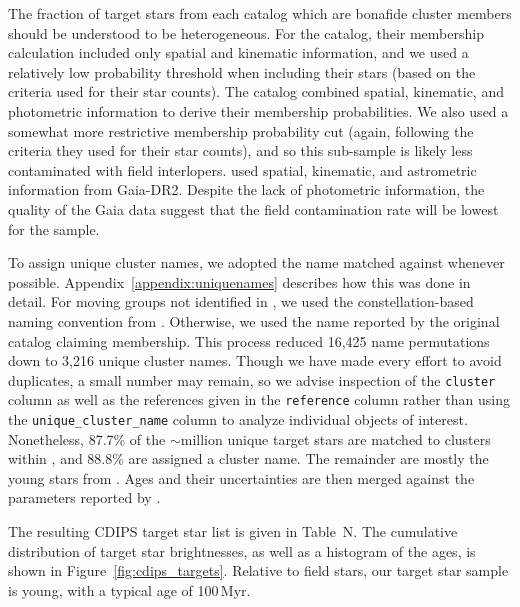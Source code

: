 \documentclass[12pt,twocolumn,tighten]{aastex62}
\begin{document}
The fraction of target stars from each catalog which are bonafide
cluster members should be understood to be heterogeneous.  For the
\citet{dias_proper_2014} catalog, their membership calculation
included only spatial and kinematic information, and we used a
relatively low probability threshold when including their stars (based
on the criteria \citealt{dias_proper_2014} used for their star
counts).  The \citet{Kharchenko_et_al_2013} catalog combined spatial,
kinematic, and photometric information to derive their membership
probabilities.  We also used a somewhat more restrictive membership
probability cut (again, following the criteria they used for their
star counts), and so this sub-sample is likely less contaminated
with field interlopers.
\citet{cantat-gaudin_gaia_2018} used spatial, kinematic, and
astrometric information from Gaia-DR2. Despite the lack of
photometric information, the quality of the Gaia data suggest that the
field contamination rate will be lowest for the
\citet{cantat-gaudin_gaia_2018} sample.


To assign unique cluster names, we adopted the name matched against
\citet{Kharchenko_et_al_2013} whenever possible.
Appendix~\ref{appendix:uniquenames} describes  how this was done in detail.
For moving groups not identified in \citet{Kharchenko_et_al_2013}, we used
the constellation-based naming convention from
\citet{gagne_banyan_XI_2018}.  Otherwise, we used the name reported by
the original catalog claiming membership.  This process reduced 16,425
name permutations down to 3,216 unique cluster names.  Though we have
made every effort to avoid duplicates, a small number may remain, so we
advise inspection of the \texttt{cluster} column
as well as the references given in the
\texttt{reference} column rather than using the
\texttt{unique\_cluster\_name} column to analyze individual objects
of interest.  Nonetheless, 87.7\% of the $\sim$million unique target
stars are matched to clusters within \citet{Kharchenko_et_al_2013},
and 88.8\% are assigned a cluster name.  The remainder are mostly the
young stars from \citet{zari_3d_2018}.
Ages and their uncertainties are then merged against the 
parameters reported by \citet{Kharchenko_et_al_2013}.

The resulting CDIPS target star list is given in Table~N.
The cumulative distribution of target star brightnesses, as well as a
histogram of the ages, is shown in Figure~\ref{fig:cdips_targets}.
Relative to field stars, our target star sample is young, with a
typical age of 100$\,$Myr.
\end{document}
